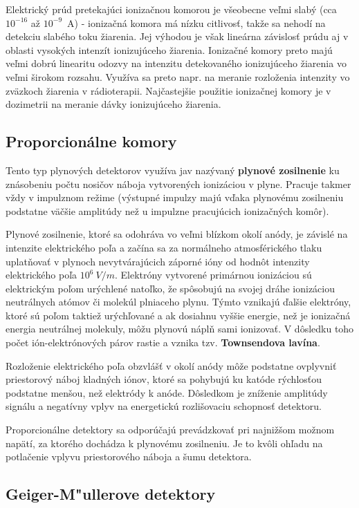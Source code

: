\documentclass[../../main.tex]{subfiles}
\begin{document}
Elektrický prúd pretekajúci ionizačnou komorou je všeobecne veľmi slabý (cca $10^{-16}$ až $10^{-9}$~A) - ionizačná komora má nízku citlivosť, takže sa nehodí na detekciu slabého toku žiarenia. Jej výhodou je však lineárna závislosť prúdu aj v oblasti vysokých intenzít ionizujúceho žiarenia. Ionizačné komory preto majú veľmi dobrú linearitu odozvy na intenzitu detekovaného ionizujúceho žiarenia vo veľmi širokom rozsahu. Využíva sa preto napr. na meranie rozloženia intenzity vo zväzkoch žiarenia v rádioterapii. Najčastejšie použitie ionizačnej komory je v dozimetrii na meranie dávky ionizujúceho žiarenia.

\subsection{Proporcionálne komory}

Tento typ plynových detektorov využíva jav nazývaný \textbf{plynové zosilnenie} ku znásobeniu počtu nosičov náboja vytvorených ionizáciou v plyne. Pracuje takmer vždy v impulznom režime (výstupné impulzy majú vďaka plynovému zosilneniu podstatne väčšie amplitúdy než u impulzne pracujúcich ionizačných komôr).

Plynové zosilnenie, ktoré sa odohráva vo veľmi blízkom okolí anódy, je závislé na intenzite elektrického poľa a začína sa za normálneho atmosférického tlaku uplatňovať v plynoch nevytvárajúcich záporné ióny od hodnôt intenzity elektrického poľa $10^6\:\unit{V/m}$. Elektróny vytvorené primárnou ionizáciou sú elektrickým poľom urýchlené natoľko, že spôsobujú na svojej dráhe ionizáciou neutrálnych atómov či molekúl plniaceho plynu. Týmto vznikajú ďalšie elektróny, ktoré sú poľom taktiež urýchľované a ak dosiahnu vyššie energie, než je ionizačná energia neutrálnej molekuly, môžu plynovú náplň sami ionizovať. V dôsledku toho počet ión-elektrónových párov rastie a vznika tzv. \textbf{Townsendova lavína}.

Rozloženie elektrického poľa obzvlášť v okolí anódy môže podstatne ovplyvniť priestorový náboj kladných iónov, ktoré sa pohybujú ku katóde rýchlosťou podstatne menšou, než elektródy k anóde. Dôsledkom je zníženie amplitúdy signálu a negatívny vplyv na energetickú rozlišovaciu schopnosť detektoru.

Proporcionálne detektory sa odporúčajú prevádzkovať pri najnižšom možnom napätí, za ktorého dochádza k plynovému zosilneniu. Je to kvôli ohľadu na potlačenie vplyvu priestorového náboja a šumu detektora.

\subsection{Geiger-M"ullerove detektory}
\end{document}
